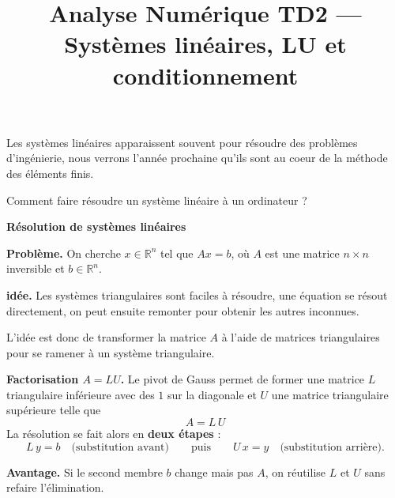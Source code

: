 

\title{Analyse Numérique TD2 --- Systèmes linéaires, LU et conditionnement}

\author{}
\date{}


\sffamily
\maketitle


Les systèmes linéaires apparaissent souvent pour résoudre des problèmes d'ingénierie, nous verrons l'année prochaine qu'ils sont au coeur de la méthode des éléments finis. 

Comment faire résoudre un système linéaire à un ordinateur ?

\vspace{2em} 

\begin{mdframed}[backgroundcolor=ThemeLight, linecolor=Theme,
  linewidth=1.5pt, innertopmargin=10pt, innerbottommargin=10pt]
\textbf{\large Résolution de systèmes linéaires}

\medskip

\textbf{Problème.}
On cherche $x \in \mathbb{R}^n$ tel que $Ax = b$,\newline 
où $A$ est une matrice $n \times n$ inversible
et $b \in \mathbb{R}^n$.

\medskip

\textbf{idée.}
Les systèmes triangulaires sont faciles à résoudre, 
une équation se résout directement, 
on peut ensuite remonter pour obtenir les autres inconnues.

L'idée est donc de transformer la matrice $A$ à l'aide de matrices triangulaires pour se ramener à un système triangulaire.
\medskip

\textbf{Factorisation $A = LU$.}
Le pivot de Gauss permet de former une matrice
$L$ triangulaire inférieure avec des $1$ sur la diagonale et $U$ une matrice triangulaire supérieure telle que
\[
  A = L\,U
\]
La résolution se fait alors en \textbf{deux étapes} :
\[
  L\,y = b \quad \text{(substitution avant)}
  \qquad \text{puis} \qquad
  U\,x = y \quad \text{(substitution arrière)}.
\]

\textbf{Avantage.}
Si le second membre $b$ change mais pas $A$,
on réutilise $L$ et $U$ sans refaire l'élimination.
\end{mdframed}

